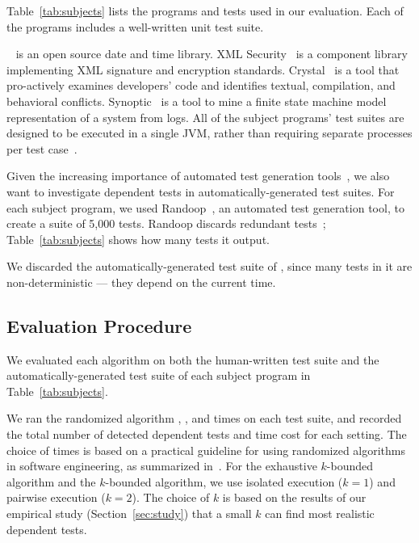 Table~\ref{tab:subjects} lists the programs and
tests used in our evaluation.
Each of the programs includes a well-written unit test suite.

\jt~\cite{jodatime} is an open source
date and time library.  XML Security~\cite{xmlsecurity}
is a component library implementing XML signature and encryption
standards. 
Crystal~\cite{Brun:2011:PDC, crystal} is a tool that
pro-actively examines developers' code and
identifies textual, compilation, and behavioral conflicts.
Synoptic~\cite{synoptic, Beschastnikh:2011:LEI} is a tool to mine a finite state
machine model representation of a system from logs.
All of the subject programs' test suites are designed to be executed in
a single JVM, rather than requiring separate processes per test case~\cite{vmvm}.

Given the increasing importance of automated test generation
tools~\cite{PachecoLET2007, ZhangSBE2011, Csallner:2004, fraseretal:ISSTA:2011},
we also want to investigate dependent tests in automatically-generated
test suites. For each subject program, we used
Randoop~\cite{PachecoLET2007}, an automated
test generation tool, to create a suite of 5,000 tests.
Randoop discards redundant tests~\cite[\S III.E]{RobinsonEPAL2011};
Table~\ref{tab:subjects} shows how many tests it output.

We discarded the automatically-generated test suite of
\jt, since many tests in it are non-deterministic ---
they depend on the current time.


\subsection{Evaluation Procedure}

We evaluated each algorithm 
on both the human-written test suite 
and the automatically-generated test suite
of each subject program in Table~\ref{tab:subjects}.


We ran the randomized algorithm \smalltrialnum, \mediumtrialnum,
and \trialnum times on each test suite, and recorded
the total number of detected dependent tests and time cost
for each setting. The choice of \trialnum times is based
on a practical guideline for using randomized algorithms
in software engineering, as summarized in~\cite{Arcuri:2011}.
%
For the exhaustive $k$-bounded algorithm
and the \dependenceaware{} $k$-bounded algorithm,
we use isolated execution ($k = 1$) and
pairwise execution ($k = 2$). The choice of $k$ is
based on the results of our empirical
study (Section~\ref{sec:study}) that a small $k$
can find most realistic dependent tests.

